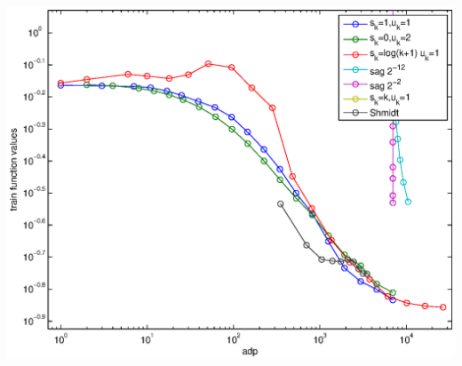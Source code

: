\documentclass[12pt]{article}
\begin{document}
	\begin{center}
	\includegraphics{Figures/adp-log.eps} 
	\end{center}
\end{document}
